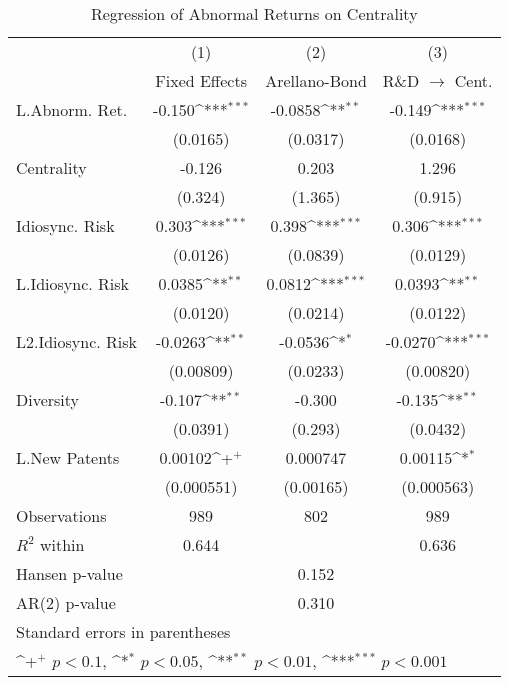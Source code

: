 \begin{table}[htbp]\centering \caption{Regression of Abnormal Returns on Centrality\label{r6}}
{
\def\sym#1{\ifmmode^{#1}\else\(^{#1}\)\fi}
\begin{tabular}{l*{3}{c}}
\hline\hline
                    &\multicolumn{1}{c}{(1)}&\multicolumn{1}{c}{(2)}&\multicolumn{1}{c}{(3)}\\
                    &\multicolumn{1}{c}{Fixed Effects}&\multicolumn{1}{c}{Arellano-Bond}&\multicolumn{1}{c}{R\&D $\rightarrow$ Cent.}\\
\hline
L.Abnorm. Ret.      &      -0.150\sym{***}&     -0.0858\sym{**} &      -0.149\sym{***}\\
                    &    (0.0165)         &    (0.0317)         &    (0.0168)         \\
Centrality          &      -0.126         &       0.203         &       1.296         \\
                    &     (0.324)         &     (1.365)         &     (0.915)         \\
Idiosync. Risk      &       0.303\sym{***}&       0.398\sym{***}&       0.306\sym{***}\\
                    &    (0.0126)         &    (0.0839)         &    (0.0129)         \\
L.Idiosync. Risk    &      0.0385\sym{**} &      0.0812\sym{***}&      0.0393\sym{**} \\
                    &    (0.0120)         &    (0.0214)         &    (0.0122)         \\
L2.Idiosync. Risk   &     -0.0263\sym{**} &     -0.0536\sym{*}  &     -0.0270\sym{***}\\
                    &   (0.00809)         &    (0.0233)         &   (0.00820)         \\
Diversity           &      -0.107\sym{**} &      -0.300         &      -0.135\sym{**} \\
                    &    (0.0391)         &     (0.293)         &    (0.0432)         \\
L.New Patents       &     0.00102\sym{+}  &    0.000747         &     0.00115\sym{*}  \\
                    &  (0.000551)         &   (0.00165)         &  (0.000563)         \\
\hline
Observations        &         989         &         802         &         989         \\
$R^2$ within                &       0.644         &                     &       0.636         \\
Hansen p-value             &                     &       0.152         &                     \\
AR(2) p-value                &                     &       0.310         &                     \\
\hline\hline
\multicolumn{4}{l}{\footnotesize Standard errors in parentheses}\\
\multicolumn{4}{l}{\footnotesize \sym{+} \(p<0.1\), \sym{*} \(p<0.05\), \sym{**} \(p<0.01\), \sym{***} \(p<0.001\)}\\
\end{tabular}
}
\end{table}

